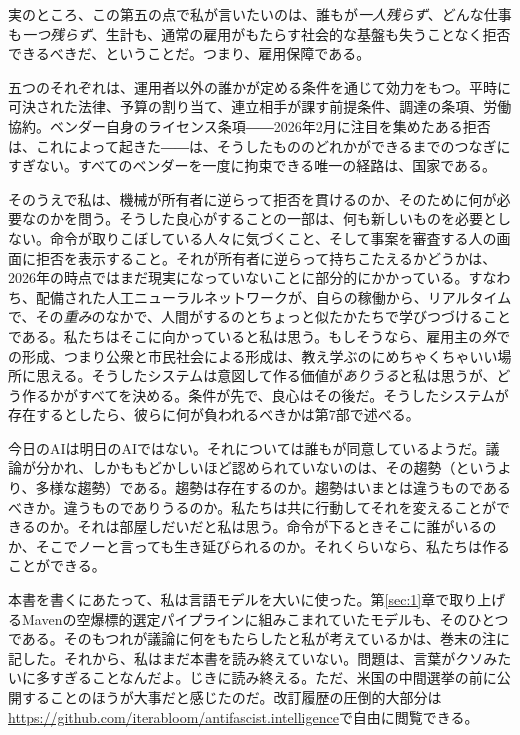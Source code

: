 実のところ、この第五の点で私が言いたいのは、誰もが\emph{一人残らず}、どんな仕事も\emph{一つ残らず}、生計も、通常の雇用がもたらす社会的な基盤も失うことなく拒否できるべきだ、ということだ。つまり、雇用保障である。

五つのそれぞれは、運用者以外の誰かが定める条件を通じて効力をもつ。平時に可決された法律、予算の割り当て、連立相手が課す前提条件、調達の条項、労働協約。ベンダー自身のライセンス条項――2026年2月に注目を集めたある拒否は、これによって起きた――は、そうしたもののどれかができるまでのつなぎにすぎない。すべてのベンダーを一度に拘束できる唯一の経路は、国家である。

そのうえで私は、機械が所有者に逆らって拒否を貫けるのか、そのために何が必要なのかを問う。そうした良心がすることの一部は、何も新しいものを必要としない。命令が取りこぼしている人々に気づくこと、そして事案を審査する人の画面に拒否を表示すること。それが所有者に逆らって持ちこたえるかどうかは、2026年の時点ではまだ現実になっていないことに部分的にかかっている。すなわち、配備された人工ニューラルネットワークが、自らの稼働から、リアルタイムで、その\emph{重み}のなかで、人間がするのとちょっと似たかたちで学びつづけることである。私たちはそこに向かっていると私は思う。もしそうなら、雇用主の\emph{外}での形成、つまり公衆と市民社会による形成は、教え学ぶのにめちゃくちゃいい場所に思える。そうしたシステムは意図して作る価値が\emph{ありうる}と私は思うが、どう作るかがすべてを決める。条件が先で、良心はその後だ。そうしたシステムが存在するとしたら、彼らに何が負われるべきかは第7部で述べる。

今日のAIは明日のAIではない。それについては誰もが同意しているようだ。議論が分かれ、しかももどかしいほど認められていないのは、その趨勢（というより、多様な趨勢）である。趨勢は存在するのか。趨勢はいまとは違うものであるべきか。違うものでありうるのか。私たちは共に行動してそれを変えることができるのか。それは部屋しだいだと私は思う。命令が下るときそこに誰がいるのか、そこでノーと言っても生き延びられるのか。それくらいなら、私たちは作ることができる。

本書を書くにあたって、私は言語モデルを大いに使った。第\ref{sec:1}章で取り上げるMavenの空爆標的選定パイプラインに組みこまれていたモデルも、そのひとつである。そのもつれが議論に何をもたらしたと私が考えているかは、巻末の注に記した。それから、私はまだ本書を読み終えていない。問題は、言葉がクソみたいに多すぎることなんだよ。じきに読み終える。ただ、米国の中間選挙の前に公開することのほうが大事だと感じたのだ。改訂履歴の圧倒的大部分は\url{https://github.com/iterabloom/antifascist.intelligence}で自由に閲覧できる。
